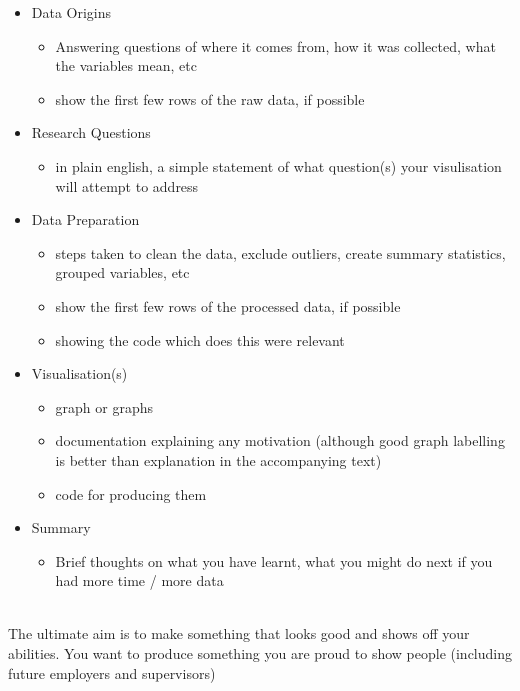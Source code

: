 \documentclass[
]{book}
\providecommand{\tightlist}{%
  \setlength{\itemsep}{0pt}\setlength{\parskip}{0pt}}
\newenvironment{info}
    {
    \hline\\
    }
    { 
    \\\\\hline
    }
\begin{document}
\begin{itemize}
\tightlist
\item
  Data Origins

  \begin{itemize}
  \tightlist
  \item
    Answering questions of where it comes from, how it was collected, what the variables mean, etc
  \item
    show the first few rows of the raw data, if possible
  \end{itemize}
\item
  Research Questions

  \begin{itemize}
  \tightlist
  \item
    in plain english, a simple statement of what question(s) your visulisation will attempt to address
  \end{itemize}
\item
  Data Preparation

  \begin{itemize}
  \tightlist
  \item
    steps taken to clean the data, exclude outliers, create summary statistics, grouped variables, etc
  \item
    show the first few rows of the processed data, if possible
  \item
    showing the code which does this were relevant
  \end{itemize}
\item
  Visualisation(s)

  \begin{itemize}
  \tightlist
  \item
    graph or graphs
  \item
    documentation explaining any motivation (although good graph labelling is better than explanation in the accompanying text)
  \item
    code for producing them
  \end{itemize}
\item
  Summary

  \begin{itemize}
  \tightlist
  \item
    Brief thoughts on what you have learnt, what you might do next if you had more time / more data
  \end{itemize}
\end{itemize}

\begin{info}
The ultimate aim is to make something that looks good and shows off your
abilities. You want to produce something you are proud to show people
(including future employers and supervisors)
\end{info}
\end{document}

